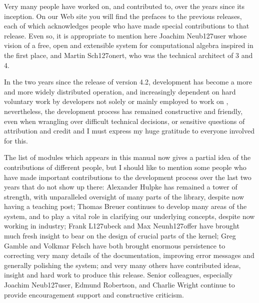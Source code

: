 
Very many people have worked on, and contributed to, {\GAP} over the
years since its inception. On our Web site you will find the prefaces
to the previous releases, each of which acknowledges people who have
made special contributions to that release. Even so, it is appropriate
to mention here Joachim Neub\accent127user whose vision of a free,
open and extensible system for computational algebra inspired {\GAP}
in the first place, and Martin Sch\accent127onert, who was the
technical architect of {\GAP} 3 and {\GAP} 4.

In the two years since the release of version 4.2, {\GAP} development
has become a more and more widely distributed operation, and
increasingly dependent on hard voluntary work by developers not solely
or mainly employed to work on {\GAP}, nevertheless, the development
process has remained constructive and friendly, even when wrangling
over difficult technical decisions, or sensitive questions of
attribution and credit and I must express my huge gratitude to
everyone involved for this.

The list of modules which appears in this manual now gives a partial
idea of the contributions of different people, but I should like to
mention some people who have made important contributions to the
development process over the last two years that do not show up there:
Alexander Hulpke has remained a tower of strength, with unparalleled
oversight of many parts of the library, despite now having a teaching
post; Thomas Breuer continues to develop many areas of the system, and
to play a vital role in clarifying our underlying concepts, despite
now working in industry; Frank L\accent127ubeck and Max Neunh\accent127offer have
brought much fresh insight to bear on the design of crucial parts of
the kernel; Greg Gamble and Volkmar Felsch have both brought enormous
persistence to correcting very many details of the documentation,
improving error messages and generally polishing the system; and very
many others have contributed ideas, insight and hard work to produce
this release. Senior colleagues, especially Joachim Neub\accent127user, Edmund
Robertson, and Charlie Wright continue to provide encouragement
support and constructive criticism.





